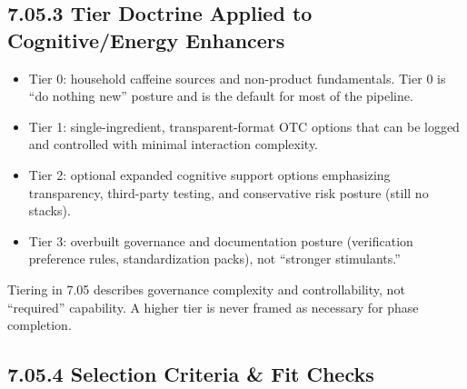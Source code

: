 \documentclass[10pt]{article}
\begin{document}
\subsection*{7.05.3 Tier Doctrine Applied to Cognitive/Energy Enhancers}
{}

\begin{itemize}
\item Tier 0: household caffeine sources and non-product fundamentals. Tier 0 is “do nothing new” posture and is the default for most of the pipeline.
\item Tier 1: single-ingredient, transparent-format OTC options that can be logged and controlled with minimal interaction complexity.
\item Tier 2: optional expanded cognitive support options emphasizing transparency, third-party testing, and conservative risk posture (still no stacks).
\item Tier 3: overbuilt governance and documentation posture (verification preference rules, standardization packs), not “stronger stimulants.”
\end{itemize}

Tiering in 7.05 describes governance complexity and controllability, not “required” capability. A higher tier is never framed as necessary for phase completion.

\subsection*{7.05.4 Selection Criteria \& Fit Checks}
{}
\end{document}
